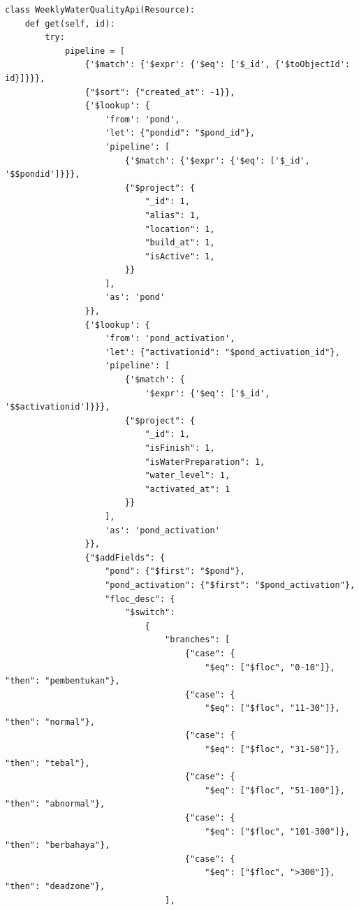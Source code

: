 \begin{enumerate}[1.]
\begin{lstlisting}
class WeeklyWaterQualityApi(Resource):
    def get(self, id):
        try:
            pipeline = [
                {'$match': {'$expr': {'$eq': ['$_id', {'$toObjectId': id}]}}},
                {"$sort": {"created_at": -1}},
                {'$lookup': {
                    'from': 'pond',
                    'let': {"pondid": "$pond_id"},
                    'pipeline': [
                        {'$match': {'$expr': {'$eq': ['$_id', '$$pondid']}}},
                        {"$project": {
                            "_id": 1,
                            "alias": 1,
                            "location": 1,
                            "build_at": 1,
                            "isActive": 1,
                        }}
                    ],
                    'as': 'pond'
                }},
                {'$lookup': {
                    'from': 'pond_activation',
                    'let': {"activationid": "$pond_activation_id"},
                    'pipeline': [
                        {'$match': {
                            '$expr': {'$eq': ['$_id', '$$activationid']}}},
                        {"$project": {
                            "_id": 1,
                            "isFinish": 1,
                            "isWaterPreparation": 1,
                            "water_level": 1,
                            "activated_at": 1
                        }}
                    ],
                    'as': 'pond_activation'
                }},
                {"$addFields": {
                    "pond": {"$first": "$pond"},
                    "pond_activation": {"$first": "$pond_activation"},
                    "floc_desc": {
                        "$switch":
                            {
                                "branches": [
                                    {"case": {
                                        "$eq": ["$floc", "0-10"]}, "then": "pembentukan"},
                                    {"case": {
                                        "$eq": ["$floc", "11-30"]}, "then": "normal"},
                                    {"case": {
                                        "$eq": ["$floc", "31-50"]}, "then": "tebal"},
                                    {"case": {
                                        "$eq": ["$floc", "51-100"]}, "then": "abnormal"},
                                    {"case": {
                                        "$eq": ["$floc", "101-300"]}, "then": "berbahaya"},
                                    {"case": {
                                        "$eq": ["$floc", ">300"]}, "then": "deadzone"},
                                ],

\end{lstlisting}
\end{enumerate}
